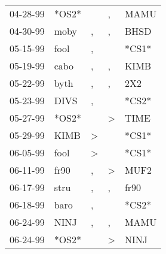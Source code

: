\begin{supertabular}{p{0.07\textwidth}p{0.06\textwidth}p{0.02\textwidth}p{0.02\textwidth}p{0.06\textwidth}}
          04-28-99\textsuperscript{} &                            *OS2* &                  &                , &           MAMU\textsuperscript{} \\
          04-30-99\textsuperscript{} &           moby\textsuperscript{} &                , &                , &           BHSD\textsuperscript{} \\
          05-15-99\textsuperscript{} &           fool\textsuperscript{} &                , &                  &                            *CS1* \\
          05-19-99\textsuperscript{} &           cabo\textsuperscript{} &                , &                , &           KIMB\textsuperscript{} \\
          05-22-99\textsuperscript{} &           byth\textsuperscript{} &                , &                , &            2X2\textsuperscript{} \\
          05-23-99\textsuperscript{} &           DIVS\textsuperscript{} &                , &                  &                            *CS2* \\
          05-27-99\textsuperscript{} &                            *OS2* &                  &     \textgreater &           TIME\textsuperscript{} \\
          05-29-99\textsuperscript{} &           KIMB\textsuperscript{} &     \textgreater &                  &                            *CS1* \\
          06-05-99\textsuperscript{} &           fool\textsuperscript{} &     \textgreater &                  &                            *CS1* \\
          06-11-99\textsuperscript{} &           fr90\textsuperscript{} &                , &     \textgreater &           MUF2\textsuperscript{} \\
          06-17-99\textsuperscript{} &           stru\textsuperscript{} &                , &                , &           fr90\textsuperscript{} \\
          06-18-99\textsuperscript{} &           baro\textsuperscript{} &                , &                  &                            *CS2* \\
          06-24-99\textsuperscript{} &           NINJ\textsuperscript{} &                , &                , &           MAMU\textsuperscript{} \\
          06-24-99\textsuperscript{} &                            *OS2* &                  &     \textgreater &           NINJ\textsuperscript{} \\

\end{supertabular}
